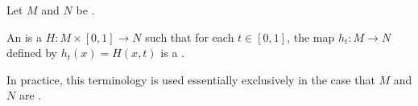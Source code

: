 \begin{definition} \label{definition:isotopy_between_topological_spaces}
Let $M$ and $N$ be . 

An  is a  $H: M \times [0, 1] \to N$ such that for each $t \in [0, 1]$, the map $h_t: M \to N$ defined by $h_t(x) = H(x, t)$ is a .

In practice, this terminology is used essentially exclusively in the case that $M$ and $N$ are .

\end{definition}